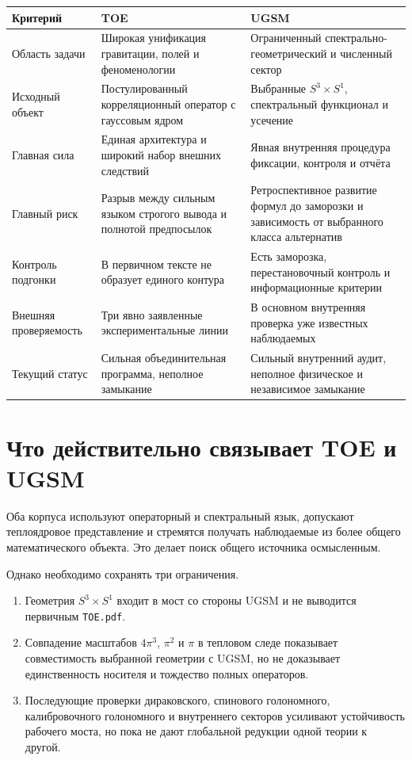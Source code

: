 \documentclass[12pt,a4paper]{article}
\begin{document}
\begin{longtable}{>{\raggedright\arraybackslash}p{3.5cm}
                  >{\raggedright\arraybackslash}p{5.2cm}
                  >{\raggedright\arraybackslash}p{5.2cm}}
\toprule
Критерий & TOE & UGSM \\
\midrule
\endhead
Область задачи & Широкая унификация гравитации, полей и феноменологии &
Ограниченный спектрально-геометрический и численный сектор \\
Исходный объект & Постулированный корреляционный оператор с гауссовым ядром &
Выбранные $S^3\times S^1$, спектральный функционал и усечение \\
Главная сила & Единая архитектура и широкий набор внешних следствий &
Явная внутренняя процедура фиксации, контроля и отчёта \\
Главный риск & Разрыв между сильным языком строгого вывода и полнотой
предпосылок & Ретроспективное развитие формул до заморозки и зависимость от
выбранного класса альтернатив \\
Контроль подгонки & В первичном тексте не образует единого контура &
Есть заморозка, перестановочный контроль и информационные критерии \\
Внешняя проверяемость & Три явно заявленные экспериментальные линии &
В основном внутренняя проверка уже известных наблюдаемых \\
Текущий статус & Сильная объединительная программа, неполное замыкание &
Сильный внутренний аудит, неполное физическое и независимое замыкание \\
\bottomrule
\end{longtable}

\section{Что действительно связывает TOE и UGSM}

Оба корпуса используют операторный и спектральный язык, допускают
теплоядровое представление и стремятся получать наблюдаемые из более общего
математического объекта. Это делает поиск общего источника осмысленным.

Однако необходимо сохранять три ограничения.
\begin{enumerate}
    \item Геометрия $S^3\times S^1$ входит в мост со стороны UGSM и не
    выводится первичным \texttt{TOE.pdf}.
    \item Совпадение масштабов $4\pi^3$, $\pi^2$ и $\pi$ в тепловом следе
    показывает совместимость выбранной геометрии с UGSM, но не доказывает
    единственность носителя и тождество полных операторов.
    \item Последующие проверки дираковского, спинового голономного,
    калибровочного голономного и внутреннего секторов усиливают устойчивость
    рабочего моста, но пока не дают глобальной редукции одной теории к другой.
\end{enumerate}
\end{document}
